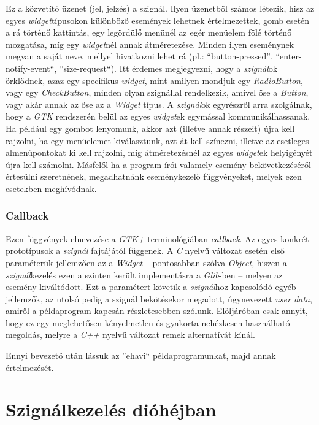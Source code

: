 Ez a közvetítő üzenet (jel, jelzés) a szignál. Ilyen üzenetből számos létezik, hisz az egyes \textit{widget}típusokon különböző események lehetnek értelmezettek, gomb esetén a rá történő kattintás, egy legördülő menünél az egér menüelem fölé történő mozgatása, míg egy \textit{widget}nél annak átméretezése. Minden ilyen eseménynek megvan a saját neve, mellyel hivatkozni lehet rá (pl.: ``button-pressed'', ``enter-notify-event``, ''size-request``). Itt érdemes megjegyezni, hogy a \textit{szignál}ok örklődnek, azaz egy specifikus \textit{widget}, mint amilyen mondjuk egy \textit{RadioButton}, vagy egy \textit{CheckButton}, minden olyan szignállal rendelkezik, amivel őse a \textit{Button}, vagy akár annak az őse az a \textit{Widget} típus. A \textit{szignál}ok egyrészről arra szolgálnak, hogy a \textit{GTK} rendszerén belül az egyes \textit{widget}ek egymással kommunikálhassanak. Ha például egy gombot lenyomunk, akkor azt (illetve annak részeit) újra kell rajzolni, ha egy menüelemet kiválasztunk, azt át kell színezni, illetve az esetleges almenüpontokat ki kell rajzolni, míg átméretezésnél az egyes \textit{widget}ek helyigényét újra kell számolni. Másfelől ha a program írói valamely esemény bekövetkezéséről értesülni szeretnének, megadhatnánk eseménykezelő függvényeket, melyek ezen esetekben meghívódnak.

\subsubsection{Callback}

Ezen függvények elnevezése a \textit{GTK+} terminológiában \textit{callback}. Az egyes konkrét prototípusok a \textit{szignál} fajtájától függenek. A \textit{C} nyelvű változat esetén első paraméterük jellemzően az a \textit{Widget} -- pontosabban szólva \textit{Object}, hiszen a \textit{szignál}kezelés ezen a szinten került implementásra a \textit{Glib}-ben -- melyen az esemény kiváltódott. Ezt a paramétert követik a \textit{szignál}hoz kapcsolódó egyéb jellemzők, az utolsó pedig a szignál bekötésekor megadott, úgynevezett \textit{user data}, amiről a példaprogram kapcsán részletesebben szólunk. Elöljáróban csak annyit, hogy ez egy meglehetősen kényelmetlen és gyakorta nehézkesen használható megoldás, melyre a \textit{C++} nyelvű változat remek alternatívát kínál.

Ennyi bevezető után lássuk az ''ehavi`` példaprogramunkat, majd annak értelmezését.

\section{Szignálkezelés dióhéjban}


